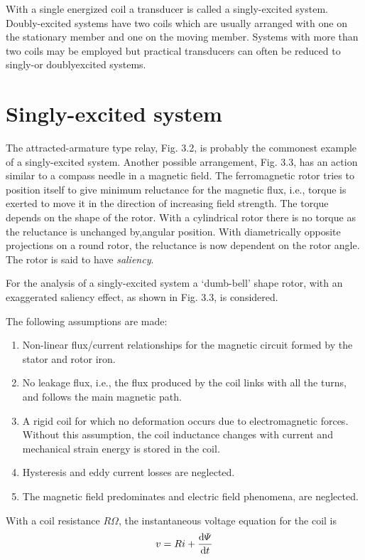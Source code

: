 \documentclass[a4paper,numbers=noenddot,12pt]{scrbook}
\begin{document}
With a single energized coil a transducer is called a singly-excited system. Doubly-excited systems have two coils which are usually arranged with one on the stationary member and one on the moving member. Systems with more than two coils may be employed but practical transducers can often be reduced to singly-or doubly­excited systems. 

\section{Singly-excited system} 
The attracted-armature type relay, Fig. 3.2, is probably the commonest example of a singly-excited system. Another possible arrangement, Fig. 3.3, has an action similar to a compass needle in a magnetic field. The ferromagnetic rotor tries to position itself to give minimum reluctance for the magnetic flux, i.e., torque is exerted to move it in the direction of increasing field strength. The torque depends on the shape of the rotor. With a cylindrical rotor there is no torque as the reluctance
is unchanged by,angular position. With diametrically opposite projections on a round rotor, the reluctance is now dependent on the rotor angle. The rotor is said to have 
\textit{saliency}.

For the analysis of a singly-excited system a `dumb-bell' shape rotor, with an exaggerated saliency effect, as shown in Fig. 3.3, is considered. 

The following assumptions are made:
\begin{enumerate}[label={(\alph*)}, leftmargin=*]
    \item Non-linear flux/current relationships for the magnetic circuit formed by the stator and rotor iron.
    \item No leakage flux, i.e., the flux produced by the coil links with all the turns, and follows the main magnetic path.
    \item A rigid coil for which no deformation occurs due to electromagnetic forces. Without this assumption, the coil inductance changes with current and mechanical strain energy is stored in the coil.
    \item Hysteresis and eddy current losses are neglected.
    \item The magnetic field predominates and electric field phenomena, are neglected. 
\end{enumerate}

With a coil resistance $R \Omega$, the instantaneous voltage equation for the coil is
\begin{equation}
    v = Ri + \dfrac{\dif \varPsi}{\dif t}
    \label{eq:Eq3.7}
\end{equation}
\end{document}
